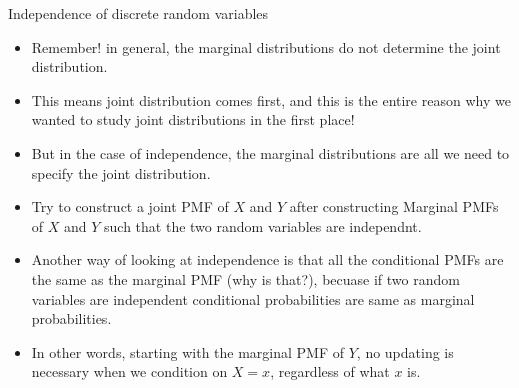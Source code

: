 \documentclass[8pt, usepdftitle=false]{beamer}
\begin{document}
\begin{frame}{Independence of discrete random variables}

\begin{itemize}
   \item Remember! in general, the marginal distributions do not determine the joint distribution.

   \item This means joint distribution comes first, and this is the entire reason why we wanted to study joint distributions in the first place! 

   \item But in the case of independence, the marginal distributions are all we need to specify the joint distribution.

   \item Try to construct a joint PMF of $X$ and $Y$ after constructing Marginal PMFs of $X$ and $Y$ such that the two random variables are independnt. 

   \item Another way of looking at independence is that all the conditional PMFs are the same as the marginal PMF (why is that?), becuase if two random variables are independent conditional probabilities are same as marginal probabilities.

   \item In other words, starting with the marginal PMF of $Y$, no updating is necessary when we condition on $X=x$, regardless of what $x$ is. 
 \end{itemize} 

\end{frame}
\end{document}
